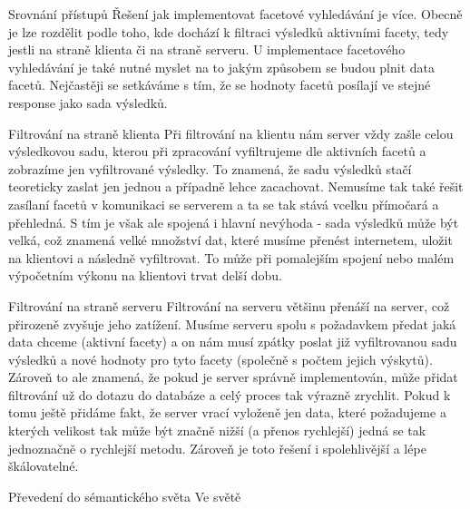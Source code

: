 \sec Srovnání přístupů
Řešení jak implementovat facetové vyhledávání je více. 
Obecně je lze rozdělit podle toho, kde dochází k filtraci výsledků aktivními facety, tedy jestli na straně klienta či na straně serveru.
U implementace facetového vyhledávání je také nutné myslet na to jakým způsobem se budou plnit data facetů. Nejčastěji se setkáváme s tím, že se
hodnoty facetů posílají ve stejné response jako sada výsledků. 

  \secc Filtrování na straně klienta
  Při filtrování na klientu nám server vždy zašle celou výsledkovou sadu, kterou při zpracování vyfiltrujeme dle aktivních facetů a zobrazíme jen vyfiltrované výsledky.
  To znamená, že sadu výsledků stačí teoreticky zaslat jen jednou a případně lehce zacachovat.
  Nemusíme tak také řešit zasílaní facetů v komunikaci se serverem a ta se tak stává vcelku přímočará a přehledná.
  S tím je však ale spojená i hlavní nevýhoda - sada výsledků může být velká, což znamená velké množství dat, které musíme přenést internetem, uložit na klientovi a následně vyfiltrovat.
  To může při pomalejším spojení nebo malém výpočetním výkonu na klientovi trvat delší dobu. 

  \secc Filtrování na straně serveru
  Filtrování na serveru většinu  přenáší na server, což přirozeně zvyšuje jeho zatížení.
  Musíme serveru spolu s požadavkem předat jaká data chceme (aktivní facety) a on nám musí zpátky poslat již vyfiltrovanou sadu výsledků a nové hodnoty pro tyto facety (společně s počtem jejich výskytů).
  Zároveň to ale znamená, že pokud je server správně implementován, může přidat filtrování už do dotazu do databáze a celý proces tak výrazně zrychlit.
  Pokud k tomu ještě přidáme fakt, že server vrací vyloženě jen data, které požadujeme a kterých velikost tak může být značně nižší (a přenos rychlejší) jedná se tak jednoznačně o rychlejší metodu.
  Zároveň je toto řešení i spolehlivější a lépe škálovatelné.
	
\sec Převedení do sémantického světa
Ve světě 
